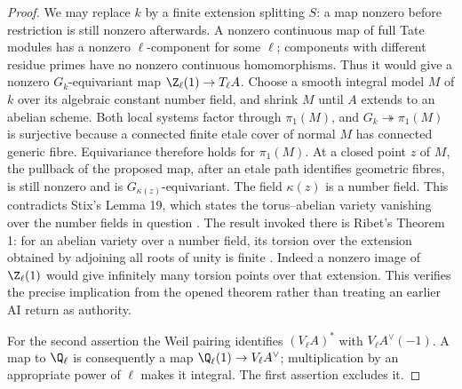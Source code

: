 \begin{proof}
We may replace $k$ by a finite extension splitting $S$: a map nonzero before
restriction is still nonzero afterwards. A nonzero continuous map of full
Tate modules has a nonzero $\ell$-component for some $\ell$; components with
different residue primes have no nonzero continuous homomorphisms. Thus it
would give a nonzero $G_k$-equivariant map $\Z_\ell(1)\to T_\ell A$.
Choose a smooth integral model $M$ of $k$ over its algebraic constant number
field, and shrink $M$ until $A$ extends to an abelian scheme. Both local
systems factor through $\pi_1(M)$, and $G_k\twoheadrightarrow\pi_1(M)$ is
surjective because a connected finite etale cover of normal $M$ has connected
generic fibre. Equivariance therefore holds for $\pi_1(M)$.
At a closed point $z$ of $M$, the pullback of the proposed map, after an
etale path identifies geometric fibres, is still nonzero and is
$G_{\kappa(z)}$-equivariant. The field $\kappa(z)$ is a number field.
This contradicts Stix's Lemma 19, which states the torus--abelian variety
vanishing over the number fields in question \citep[Lemma 19]{CF_Stix2008}.
The result invoked there is Ribet's Theorem 1: for an abelian variety over a
number field, its torsion over the extension obtained by adjoining all roots
of unity is finite \citep[Appendix, Theorem 1]{BC_KatzLang}.
Indeed a nonzero image of $\Z_\ell(1)$ would give infinitely many torsion
points over that extension. This verifies the precise implication from the
opened theorem rather than treating an earlier AI return as authority.

For the second assertion the Weil pairing identifies
$(V_\ell A)^*$ with $V_\ell A^\vee(-1)$. A map to $\Q_\ell$ is consequently
a map $\Q_\ell(1)\to V_\ell A^\vee$; multiplication by an appropriate power
of $\ell$ makes it integral. The first assertion excludes it.
\end{proof}

